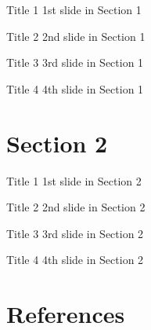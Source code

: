 \documentclass{beamer}
\begin{document}
\begin{frame}{Title 1}
    1st slide in Section 1 \cite{NGUYEN2023101868}
\end{frame}

\begin{frame}{Title 2}
    2nd slide in Section 1
\end{frame}

\begin{frame}{Title 3}
    3rd slide in Section 1
\end{frame}

\begin{frame}{Title 4}
    4th slide in Section 1
\end{frame}

\section{Section 2}

\begin{frame}{Title 1}
    1st slide in Section 2
\end{frame}

\begin{frame}{Title 2}
    2nd slide in Section 2
\end{frame}

\begin{frame}{Title 3}
    3rd slide in Section 2
\end{frame}

\begin{frame}{Title 4}
    4th slide in Section 2
\end{frame}

\section{References}

\begin{frame}[allowframebreaks]
    
    
    \nocite{*} %
\end{frame}

\end{document}
